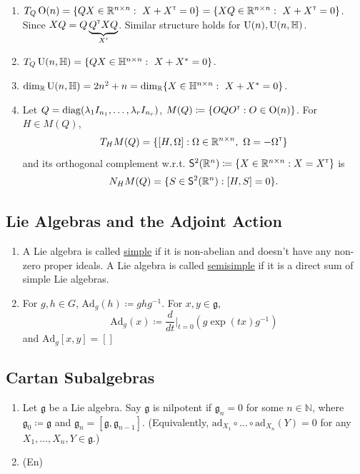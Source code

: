 \begin{enumerate}
    \item $T_Q \O(n) = \{QX \in \R^{n\times n}:\ X+X^\tp=0\} = \{XQ \in \R^{n\times n}:\ X+X^\tp=0\}$. Since $XQ = Q\underbrace{ Q^{\scriptscriptstyle\mathsf{T}} XQ}_{X'}$. Similar structure holds for $\operatorname{U}(n), \operatorname{U}(n,\mathbb{H})$.
    \item $T_Q \operatorname{U}(n,\mathbb{H}) = \{ QX \in \mathbb{H}^{n\times n}:\ X + X^*=0 \}$.
    \item $\dim_{\mathbb{R}} \operatorname{U}(n,\mathbb{H})=2n^2+n=\dim_{\mathbb{R}} \{X\in \mathbb{H}^{n\times n}:\ X+X^*=0\}$.
    \item Let $Q=\operatorname{diag}(\lambda_1 I_{n_1},\dots, \lambda_r I_{n_r})$, $M(Q)\coloneqq \{OQO^{\scriptscriptstyle\mathsf{T}}: O\in \operatorname{O}(n)\}$. For $H\in M(Q)$, \[ T_H M(Q) = \{[H,\Omega]: \Omega \in \mathbb{R}^{n\times n}, \ \Omega = -\Omega^{\scriptscriptstyle\mathsf{T}}\}\] 
    \cite[Lemma~2.1.3]{Helmke_1994_optim} and its orthogonal complement w.r.t. $\mathsf{S}^2(\mathbb{R}^n)\coloneqq \{X\in \mathbb{R}^{n\times n}: X=X^{\scriptscriptstyle\mathsf{T}}\}$ is 
    \[ N_H M(Q) = \{ S \in \mathsf{S}^2(\mathbb{R}^n): [H, S]=0 \}.\]
\end{enumerate}

\subsection{Lie Algebras and the Adjoint Action}
\begin{enumerate}
    \item A Lie algebra is called \underline{simple} if it is non-abelian and doesn't have any non-zero proper ideals. A Lie algebra is called \underline{semisimple} if it is a direct sum of simple Lie algebras.
    \item For $g,h\in G$, $\text{Ad}_g(h) \coloneqq ghg^{-1}$. For $x,y\in \mathfrak{g}$,
    \[
        \text{Ad}_g(x) \coloneqq \frac{d}{dt}|_{t=0} (g \exp(tx)g^{-1})
    \]
    and $\text{Ad}_g[x,y]=[]$
\end{enumerate}
\subsection{Cartan Subalgebras}
\begin{enumerate}
    \item Let $\mathfrak{g}$ be a Lie algebra. Say $\mathfrak{g}$ is nilpotent if $\mathfrak{g}_n=0$ for some $n\in \mathbb{N}$, where $\mathfrak{g}_0 \coloneqq \mathfrak{g}$ and $\mathfrak{g}_n = [\mathfrak{g}, \mathfrak{g}_{n-1}]$. (Equivalently, $\text{ad}_{X_1}\circ \dots \circ \text{ad}_{X_n} (Y) =0$ for any $X_1,\dots,X_n,Y\in \mathfrak{g}$.)
    \item (En)
\end{enumerate}

